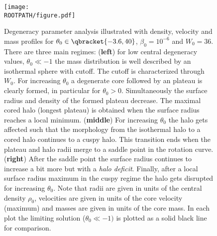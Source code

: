 \begin{figure}%
	\centering%
	\texttt{[image: \\ROOTPATH/figure.pdf]}
	\caption{Degeneracy parameter analysis illustrated with density, velocity and mass profiles for $\theta_0\in\qbracket{-3.6,40}$, $\beta_0 = 10^{-6}$ and $W_0 = 36$. There are three main regimes: (\textbf{left}) for low central degeneracy values, $\theta_0 \ll -1$  the mass distribution is well described by an isothermal sphere with cutoff. The cutoff is characterized through $W_0$. For increasing $\theta_0$ a degenerate core followed by an plateau is clearly formed, in particular for $\theta_0 > 0$. Simultaneously the surface radius and density of the formed plateau decrease. The maximal cored halo (longest plateau) is obtained when the surface radius reaches a local minimum. (\textbf{middle}) For increasing $\theta_0$ the halo gets affected such that the morphology from the isothermal halo to a cored halo continues to a cuspy halo. This transition ends when the plateau and halo radii merge to a saddle point in the rotation curve. (\textbf{right}) After the saddle point the surface radius continues to increase a bit more but with a \textit{halo deficit}. Finally, after a local surface radius maximum in the cuspy regime the halo gets disrupted for increasing $\theta_0$. Note that radii are given in units of the central density $\rho_0$, velocities are given in units of the core velocity (maximum) and masses are given in units of the core mass. In each plot the limiting solution ($\theta_0 \ll -1)$ is plotted as a solid black line for comparison.}%
	\label{fig:profile:with-cutoff:theta0:core}%
\end{figure}
